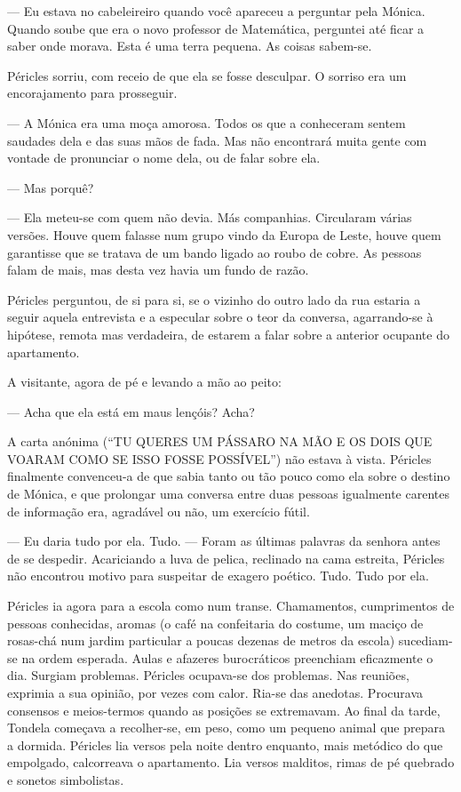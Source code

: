 --- Eu estava no cabeleireiro quando você apareceu a perguntar pela
  Mónica. Quando soube que era o novo professor de Matemática, perguntei
  até ficar a saber onde morava. Esta é uma terra pequena. As coisas
  sabem-se.


Péricles sorriu, com receio de que ela se fosse desculpar. O sorriso era
um encorajamento para prosseguir.

--- A Mónica era uma moça amorosa. Todos os que a conheceram sentem
  saudades dela e das suas mãos de
fada. Mas não encontrará muita gente com vontade de pronunciar o nome
dela, ou de falar sobre ela.

--- Mas porquê?

--- Ela meteu-se com quem não devia. Más companhias. Circularam várias
  versões. Houve quem falasse num grupo vindo da Europa de Leste, houve
  quem garantisse que se tratava de um bando ligado ao roubo de cobre.
  As pessoas falam de mais, mas desta vez havia um fundo de razão.


Péricles perguntou, de si para si, se o vizinho do outro lado da rua
estaria a seguir aquela entrevista e a especular sobre o teor da
conversa, agarrando-se à hipótese, remota mas verdadeira, de estarem a
falar sobre a anterior ocupante do apartamento.

A visitante, agora de pé e levando a mão ao peito:

--- Acha que ela está em maus lençóis? Acha?


A carta anónima (``TU QUERES UM PÁSSARO NA MÃO E OS DOIS QUE VOARAM COMO
SE ISSO FOSSE POSSÍVEL'') não estava à vista. Péricles finalmente convenceu-a de
que sabia tanto ou tão pouco como ela sobre o destino de Mónica, e que
prolongar uma conversa entre duas pessoas igualmente carentes de
informação era, agradável ou não, um exercício fútil.

--- Eu daria tudo por ela. Tudo. --- Foram as últimas palavras da
  senhora antes de se despedir. Acariciando a luva de pelica, reclinado
  na cama estreita, Péricles não encontrou motivo para suspeitar de
  exagero poético. Tudo. Tudo por ela.


Péricles ia agora para a escola como num transe. Chamamentos,
cumprimentos de pessoas conhecidas, aromas (o café na confeitaria do
costume, um maciço de rosas-chá num jardim particular a poucas dezenas
de metros da escola) sucediam-se na ordem esperada. Aulas e afazeres
burocráticos preenchiam eficazmente o dia. Surgiam problemas. Péricles ocupava-se dos
problemas. Nas reuniões, exprimia a sua opinião, por vezes com calor.
Ria-se das anedotas. Procurava consensos e meios-termos quando as
posições se extremavam. Ao final da tarde, Tondela começava a
recolher-se, em peso, como um pequeno animal que prepara a dormida.
Péricles lia versos pela noite dentro enquanto, mais metódico do que
empolgado, calcorreava o apartamento. Lia versos malditos, rimas de pé
quebrado e sonetos simbolistas.

